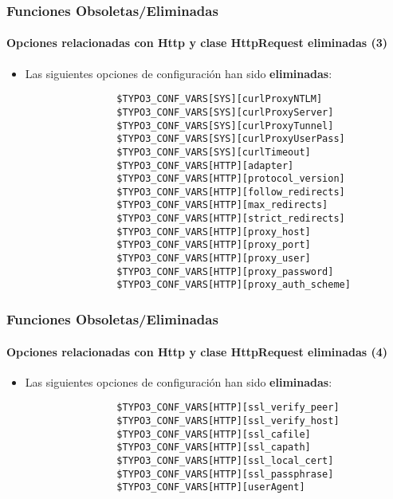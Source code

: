 \begin{frame}[fragile]
	\frametitle{Funciones Obsoletas/Eliminadas}
	\framesubtitle{Opciones relacionadas con Http y clase HttpRequest eliminadas (3)}

	\begin{itemize}

		\item Las siguientes opciones de configuración han sido \textbf{eliminadas}:
			\begin{lstlisting}
				$TYPO3_CONF_VARS[SYS][curlProxyNTLM]
				$TYPO3_CONF_VARS[SYS][curlProxyServer]
				$TYPO3_CONF_VARS[SYS][curlProxyTunnel]
				$TYPO3_CONF_VARS[SYS][curlProxyUserPass]
				$TYPO3_CONF_VARS[SYS][curlTimeout]
				$TYPO3_CONF_VARS[HTTP][adapter]
				$TYPO3_CONF_VARS[HTTP][protocol_version]
				$TYPO3_CONF_VARS[HTTP][follow_redirects]
				$TYPO3_CONF_VARS[HTTP][max_redirects]
				$TYPO3_CONF_VARS[HTTP][strict_redirects]
				$TYPO3_CONF_VARS[HTTP][proxy_host]
				$TYPO3_CONF_VARS[HTTP][proxy_port]
				$TYPO3_CONF_VARS[HTTP][proxy_user]
				$TYPO3_CONF_VARS[HTTP][proxy_password]
				$TYPO3_CONF_VARS[HTTP][proxy_auth_scheme]
			\end{lstlisting}
	\end{itemize}

\end{frame}


\begin{frame}[fragile]
	\frametitle{Funciones Obsoletas/Eliminadas}
	\framesubtitle{Opciones relacionadas con Http y clase HttpRequest eliminadas (4)}

	\begin{itemize}

		\item Las siguientes opciones de configuración han sido \textbf{eliminadas}:
			\begin{lstlisting}
				$TYPO3_CONF_VARS[HTTP][ssl_verify_peer]
				$TYPO3_CONF_VARS[HTTP][ssl_verify_host]
				$TYPO3_CONF_VARS[HTTP][ssl_cafile]
				$TYPO3_CONF_VARS[HTTP][ssl_capath]
				$TYPO3_CONF_VARS[HTTP][ssl_local_cert]
				$TYPO3_CONF_VARS[HTTP][ssl_passphrase]
				$TYPO3_CONF_VARS[HTTP][userAgent]
			\end{lstlisting}
	\end{itemize}

\end{frame}


